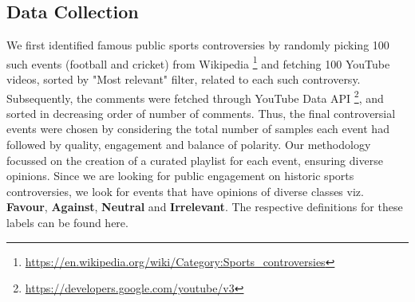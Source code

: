 \documentclass[sigconf, review]{acmart}
\begin{document}
\subsection{Data Collection}

We first identified famous public sports controversies by randomly picking 100 such events (football and cricket) from Wikipedia \footnote{\url{https://en.wikipedia.org/wiki/Category:Sports_controversies}} 
 and fetching 100 YouTube videos, sorted by "Most relevant" filter, related to each such controversy. Subsequently, the comments were fetched through YouTube Data API \footnote{\url{https://developers.google.com/youtube/v3}}, and sorted in decreasing order of number of comments. Thus, the final controversial events were chosen by considering the total number of samples each event had followed by quality, engagement and balance of polarity. Our methodology focussed on the creation of a curated playlist for each event, ensuring diverse opinions. Since we are looking for public engagement on historic sports controversies, we look for events that have opinions of diverse classes viz. {\bf Favour}, {\bf Against}, {\bf Neutral} and {\bf Irrelevant}. The respective definitions for these labels can be found here.



        
\end{document}
